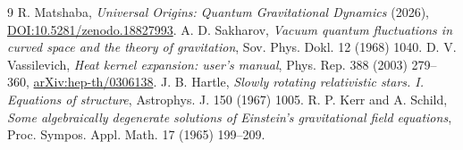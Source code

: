 \documentclass[11pt,a4paper]{article}
\begin{document}
\begin{thebibliography}{9}
 R. Matshaba, \emph{Universal Origins: Quantum Gravitational Dynamics} (2026), \href{https://doi.org/10.5281/zenodo.18827993}{DOI:10.5281/zenodo.18827993}.
 A. D. Sakharov, \emph{Vacuum quantum fluctuations in curved space and the theory of gravitation}, Sov. Phys. Dokl. 12 (1968) 1040.
 D. V. Vassilevich, \emph{Heat kernel expansion: user's manual}, Phys. Rep. 388 (2003) 279--360, \href{https://arxiv.org/abs/hep-th/0306138}{arXiv:hep-th/0306138}.
 J. B. Hartle, \emph{Slowly rotating relativistic stars. I. Equations of structure}, Astrophys. J. 150 (1967) 1005.
 R. P. Kerr and A. Schild, \emph{Some algebraically degenerate solutions of Einstein's gravitational field equations}, Proc. Sympos. Appl. Math. 17 (1965) 199--209.
\end{thebibliography}

\clearpage
\end{document}
